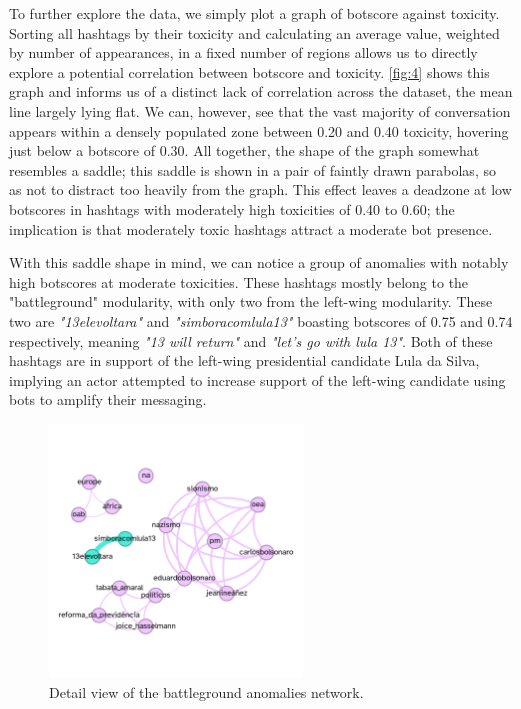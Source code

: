 \documentclass[a4paper,11pt]{article}  %
\begin{document}
	To further explore the data, we simply plot a graph of botscore against toxicity. Sorting all hashtags by their toxicity and calculating an average value, weighted by number of appearances, in a fixed number of regions allows us to directly explore a potential correlation between botscore and toxicity. \autoref{fig:4} shows this graph and informs us of a distinct lack of correlation across the dataset, the mean line largely lying flat. We can, however, see that the vast majority of conversation appears within a densely populated zone between 0.20 and 0.40 toxicity, hovering just below a botscore of 0.30. All together, the shape of the graph somewhat resembles a saddle; this saddle is shown in a pair of faintly drawn parabolas, so as not to distract too heavily from the graph. This effect leaves a deadzone at low botscores in hashtags with moderately high toxicities of 0.40 to 0.60; the implication is that moderately toxic hashtags attract a moderate bot presence. 
	
	With this saddle shape in mind, we can notice a group of anomalies with notably high botscores at moderate toxicities. These hashtags mostly belong to the "battleground" modularity, with only two from the left-wing modularity. These two are \textit{"13elevoltara"} and \textit{"simboracomlula13"} boasting botscores of 0.75 and 0.74 respectively, meaning \textit{"13 will return"} and \textit{"let's go with lula 13"}. Both of these hashtags are in support of the left-wing presidential candidate Lula da Silva, implying an actor attempted to increase support of the left-wing candidate using bots to amplify their messaging. 
	
	\begin{figure}%
		\begin{center}
			\includegraphics[width=0.6\textwidth]{images/net_anom_detail}
		\end{center}
		\caption{Detail view of the battleground anomalies network.}
		\label{fig:5}
	\end{figure}
	
\end{document}

